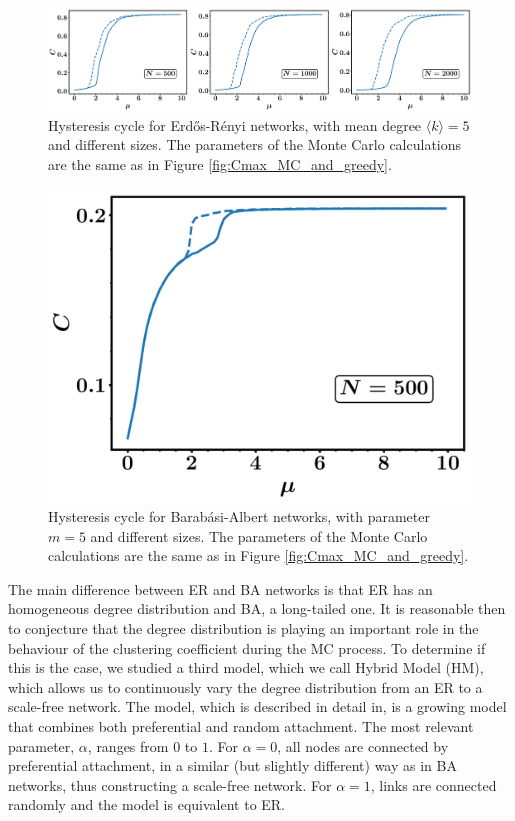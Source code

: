 \documentclass{article}
\begin{document}
\begin{figure}[ht!]
\centering
\includegraphics[scale=0.27]{./figs/Cmax_MC_and_greedy_ER}
\caption{Hysteresis cycle for Erd\H{o}s-R\'enyi networks, with mean degree $\langle k \rangle = 5$ and different sizes. The parameters of the Monte Carlo calculations are the same as in Figure \ref{fig:Cmax_MC_and_greedy}.}
\label{fig:Cmax_MC_and_greedy_ER}
\end{figure}

\begin{figure}[ht!]
\centering
\includegraphics[scale=0.27]{./figs/Cmax_MC_and_greedy_BA}
\caption{Hysteresis cycle for Barab\'asi-Albert networks, with parameter $m = 5$ and different sizes. The parameters of the Monte Carlo calculations are the same as in Figure \ref{fig:Cmax_MC_and_greedy}.}
\label{fig:Cmax_MC_and_greedy_BA}
\end{figure}

The main difference between ER and BA networks is that ER has an homogeneous degree distribution and BA, a long-tailed one. It is reasonable then to conjecture that the degree distribution is playing an important role in the behaviour of the clustering coefficient during the MC process. To determine if this is the case, we studied a third model, which we call Hybrid Model (HM), which allows us to continuously vary the degree distribution from an ER to a scale-free network. The model, which is described in detail in\cite{Gomez-Gardenes2006FromNetworks}, is a growing model that combines both preferential and random attachment. The most relevant parameter, $\alpha$, ranges from $0$ to $1$. For $\alpha = 0$, all nodes are connected by preferential attachment, in a similar (but slightly different) way as in BA networks, thus constructing a scale-free network. For $\alpha = 1$, links are connected randomly and the model is equivalent to ER. 
\end{document}
